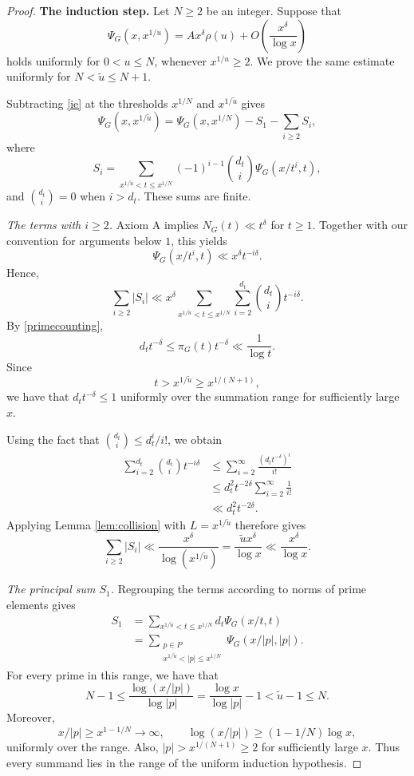 \documentclass[10pt,a4paper]{amsart}
\begin{document}
\begin{proof}
\smallskip
\noindent\textbf{The induction step.}
Let $N\ge2$ be an integer. Suppose that
\begin{equation}\label{ih}
\Psi_G(x,x^{1/u})
=
Ax^\delta\rho(u)
+O\!\left(\frac{x^\delta}{\log x}\right)
\end{equation}
holds uniformly for $0<u\le N$, whenever
$x^{1/u}\ge2$. We prove the same estimate uniformly for
$N<\tilde u\le N+1$.

Subtracting \eqref{ie} at the thresholds $x^{1/N}$
and $x^{1/\tilde u}$ gives
\begin{equation}\label{subtract}
\Psi_G(x,x^{1/\tilde u})
=
\Psi_G(x,x^{1/N})-S_1-\sum_{i\ge2}S_i,
\end{equation}
where
\[
S_i
=
\sum_{x^{1/\tilde u}<t\le x^{1/N}}
(-1)^{i-1}\binom{d_t}{i}\Psi_G(x/t^i,t),
\]
and $\binom{d_t}{i}=0$ when $i>d_t$.
These sums are finite.

\smallskip
\noindent\emph{The terms with $i\ge2$.}
Axiom A implies $N_G(t)\ll t^\delta$ for $t\ge1$.
Together with our convention for arguments below $1$,
this yields
\[
\Psi_G(x/t^i,t)\ll x^\delta t^{-i\delta}.
\]
Hence,
\[\sum_{i\ge2}|S_i|
\ll
x^\delta
\sum_{x^{1/\tilde u}<t\le x^{1/N}}
\sum_{i=2}^{d_t}\binom{d_t}{i}t^{-i\delta}.
\]
By \eqref{primecounting},
\[
d_tt^{-\delta}
\le\pi_G(t)t^{-\delta}
\ll\frac1{\log t}.
\]
Since
\[
t>x^{1/\tilde u}\ge x^{1/(N+1)},
\]
we have that $d_tt^{-\delta}\le1$ uniformly over the
summation range for sufficiently large $x$.

Using the fact that $\binom{d_t}{i}\le d_t^i/i!$, we obtain
\begin{align*}
\sum_{i=2}^{d_t}\binom{d_t}{i}t^{-i\delta}
&\le
\sum_{i=2}^\infty\frac{(d_tt^{-\delta})^i}{i!}\\
&\le
d_t^2t^{-2\delta}\sum_{i=2}^\infty\frac1{i!}\\
&\ll d_t^2t^{-2\delta}.
\end{align*}
Applying Lemma \ref{lem:collision} with
$L=x^{1/\tilde u}$ therefore gives
\begin{equation}\label{error}
\sum_{i\ge2}|S_i|
\ll
\frac{x^\delta}{\log(x^{1/\tilde u})}
=
\frac{\tilde u x^\delta}{\log x}
\ll\frac{x^\delta}{\log x}.
\end{equation}

\smallskip
\noindent\emph{The principal sum $S_1$.}
Regrouping the terms according to norms of prime elements gives
\begin{equation}\label{regroup}
\begin{split}
S_1
&=
\sum_{x^{1/\tilde u}<t\le x^{1/N}}
d_t\Psi_G(x/t,t)\\
&=
\sum_{\substack{p\in P\\
x^{1/\tilde u}<|p|\le x^{1/N}}}
\Psi_G(x/|p|,|p|).
\end{split}
\end{equation}
For every prime in this range, we have that
\[
N-1
\le
\frac{\log(x/|p|)}{\log|p|}
=
\frac{\log x}{\log|p|}-1
<
\tilde u-1
\le N.
\]
Moreover,
\[
x/|p|\ge x^{1-1/N}\longrightarrow\infty,
\qquad
\log(x/|p|)\ge(1-1/N)\log x,
\]
uniformly over the range. Also,
$|p|>x^{1/(N+1)}\ge2$ for sufficiently large $x$.
Thus every summand lies in the range of the uniform
induction hypothesis.


\end{proof}
\end{document}
